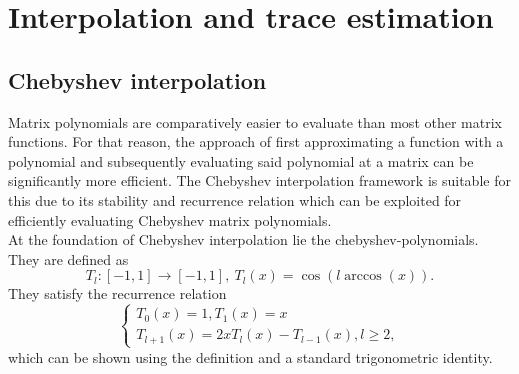 \chapter{Interpolation and trace estimation}
\label{chp:2-chebyshev}




\section{Chebyshev interpolation}
\label{sec:2-chebyshev-interpolation}

Matrix polynomials are comparatively easier to evaluate than most other
matrix functions. For that reason, the approach of first approximating
a function with a polynomial and subsequently evaluating said polynomial at a
matrix can be significantly more efficient.
The Chebyshev interpolation framework is suitable for this due to its stability
and recurrence relation  which can
be exploited for efficiently evaluating Chebyshev matrix polynomials.\\

At the foundation of Chebyshev interpolation lie the \glspl{chebyshev-polynomial}.
They are defined as \cite[Chapter~3]{trefethen2019chebyshev}
\begin{equation}
    T_l: [-1, 1] \to [-1, 1],~T_l(x) = \cos(l \arccos(x)).
    \label{equ:2-chebyshev-chebyshev-definition}
\end{equation}
They satisfy the recurrence relation
\begin{equation}
    \begin{cases}
        T_0(x) = 1, T_1(x) = x \\ T_{l+1}(x) = 2x T_l(x) - T_{l-1}(x), l \geq 2,
    \end{cases}
    \label{equ:2-chebyshev-chebyshev-recursion}
\end{equation}
which can be shown using the definition 
and a standard trigonometric identity.\\


